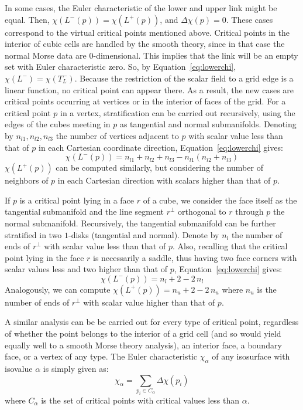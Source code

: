 In some cases, the Euler characteristic of the lower and upper link
might be equal. Then, $\chi(L^-(p)) = \chi(L^+(p))$, and
$\Delta\chi(p) = 0$. These cases correspond to the virtual critical
points mentioned above.
%
Critical points in the interior of cubic cells are handled by the
smooth theory, since in that case the normal Morse data are
0-dimensional. This implies that the link will be an empty set with
Euler characteristic zero. So, by Equation~\eqref{eq:lowerchi},
$\chi(L^-) = \chi(T_L^-)$. Because the restriction of the scalar field
to a grid edge is a linear function, no critical point can appear
there. As a result, the new cases are critical points occurring at
vertices or in the interior of faces of the grid.  For a critical
point $p$ in a vertex, stratification can be carried out recursively,
using the edges of the cubes meeting in $p$ as tangential and normal
submanifolds. Denoting by $n_{l1},n_{l2},n_{l3}$ the number of
vertices adjacent to $p$ with scalar value less than that of $p$ in
each Cartesian coordinate direction, Equation~\eqref{eq:lowerchi}
gives:
\begin{equation}
\chi(L^-(p)) = n_{l1}+n_{l2}+n_{l3} - n_{l1}(n_{l2}+n_{l3})
\end{equation}
$\chi(L^+(p))$ can be computed similarly, but considering the number of neighbors of $p$ in each Cartesian 
direction with scalars higher than that of $p$.

If $p$ is a critical point lying in a face $r$ of a cube, we consider
the face itself as the tangential submanifold and the line segment
$r^\perp$ orthogonal to $r$ through $p$ the normal submanifold.
Recursively, the tangential submanifold can be further stratified in
two $1$-disks (tangential and normal).  Denote by $n_l$ the number of
ends of $r^\perp$ with scalar value less than that of $p$. Also,
recalling that the critical point lying in the face $r$ is necessarily
a saddle, thus having two face corners with scalar values less and two
higher than that of $p$, Equation~\eqref{eq:lowerchi} gives:
\begin{equation}
\chi(L^-(p)) = n_l+2 - 2\,n_l
\end{equation}
Analogously, we can compute $\chi(L^+(p)) = n_u+2 - 2\,n_u$ where
$n_u$ is the number of ends of $r^\perp$ with scalar value higher than
that of $p$.

A similar analysis can be be carried out for every type of critical
point, regardless of whether the point belongs to the interior of a
grid cell (and so would yield equally well to a smooth Morse theory
analysis), an interior face, a boundary face, or a vertex of any
type. The Euler characteristic $\chi_\alpha$ of any isosurface with
isovalue $\alpha$ is simply given as:
\begin{equation}
\chi_\alpha = \sum_{p_i\in C_\alpha} \Delta\chi(p_i)
\label{ref:chis}
\end{equation}
where $C_\alpha$ is the set of critical points with critical values less than $\alpha$.

